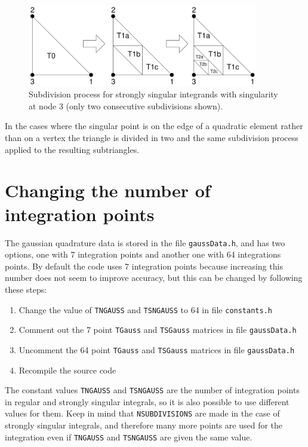 \documentclass[12pt]{report}
\begin{document}
\begin{figure}[!hbt]
\begin{center}
\includegraphics[width=0.9\textwidth]{strongly_singular.pdf}
\caption{Subdivision process for strongly singular integrands with singularity at node 3 (only two consecutive subdivisions shown).}\label{fig:strong}
\end{center}
\end{figure}

In the cases where the singular point is on the edge of a quadratic element rather than on a vertex the triangle is divided in two and the same subdivision process applied to the resulting subtriangles.

\section{Changing the number of integration points}
The gaussian quadrature data is stored in the file \verb+gaussData.h+, and has two options, one with 7 integration points and another one with 64 integrations points. By default the code uses 7 integration points because increasing this number does not seem to improve accuracy, but this can be changed by following these steps:

\begin{enumerate}
\item Change the value of \verb+TNGAUSS+ and \verb+TSNGAUSS+ to 64 in file \verb+constants.h+
\item Comment out the 7 point \verb+TGauss+ and \verb+TSGauss+ matrices in file \verb+gaussData.h+
\item Uncomment the 64 point \verb+TGauss+ and \verb+TSGauss+ matrices in file \verb+gaussData.h+
\item Recompile the source code
\end{enumerate}

The constant values \verb+TNGAUSS+ and \verb+TSNGAUSS+ are the number of integration points in regular and strongly singular integrals, so it is also possible to use different values for them. Keep in mind that \verb+NSUBDIVISIONS+ are made in the case of strongly singular integrals, and therefore many more points are used for the integration even if \verb+TNGAUSS+ and \verb+TSNGAUSS+ are given the same value.
\end{document}
